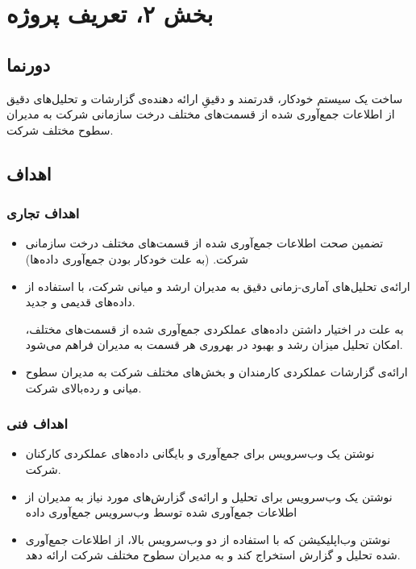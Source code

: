 \chapter{بخش ۲، تعریف پروژه\\}
\section{دورنما }\label{vision}
ساخت یک سیستم خودکار، قدرتمند و دقیقِ ارائه دهنده‌ی گزارشات و تحلیل‌های دقیق از اطلاعات جمع‌آوری شده از قسمت‌های مختلف درخت سازمانی شرکت  به مدیران سطوح مختلف شرکت.

\section{اهداف }
\subsection{اهداف تجاری}\label{bo}
\begin{itemize}
\item 
تضمین صحت اطلاعات جمع‌آوری شده از قسمت‌های مختلف درخت سازمانی شرکت. (به علت خودکار بودن جمع‌آوری داده‌ها)
\item 
ارائه‌ی تحلیل‌های آماری-زمانی دقیق به مدیران ارشد و میانی شرکت، با استفاده از داده‌های قدیمی و جدید.

به علت در اختیار‌ داشتن داده‌های عملکردی جمع‌آوری شده از قسمت‌های مختلف، امکان تحلیل میزان رشد و بهبود در بهروری هر قسمت به مدیران فراهم می‌شود.
\item 
ارائه‌ی گزارشات عملکردی کارمندان و بخش‌های مختلف شرکت به مدیران سطوح میانی و رده‌بالای شرکت.
\end{itemize}
\subsection{اهداف فنی}\label{tech-objective}
\begin{itemize}
\item
نوشتن یک وب‌سرویس برای جمع‌آوری و بایگانی داده‌های عملکردی کارکنان شرکت.
\item 
نوشتن یک وب‌سرویس برای تحلیل‌ و ارائه‌ی گزار‌ش‌های مورد نیاز به مدیران از اطلاعات جمع‌آوری شده توسط وب‌سرویس جمع‌آوری داده
\item 
نوشتن وب‌اپلیکیشن 
که با استفاده از دو وب‌سرویس بالا، از اطلاعات جمع‌آوری شده تحلیل و گزارش استخراج کند و به مدیران سطوح مختلف شرکت ارائه دهد.
\end{itemize}

